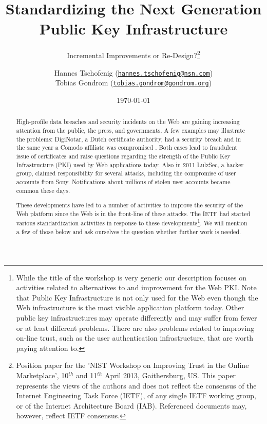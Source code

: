 \documentclass[a4paper]{scrreprt}
\title{Standardizing the Next Generation Public Key Infrastructure}
\subtitle{Incremental Improvements or Re-Design?\thanks{Position paper for the 'NIST Workshop on Improving Trust in the Online Marketplace', 10$^{th}$ and 11$^{th}$  April  2013, Gaithersburg, US. This paper represents the views of the authors and does not reflect the consensus of the Internet Engineering Task Force (IETF), of any single IETF working group, or of the Internet Architecture Board (IAB). Referenced documents may, however, reflect IETF consensus.}}
\author{Hannes Tschofenig (\texttt{\href{mailto:hannes.tschofenig@nsn.com}{hannes.tschofenig@nsn.com}})\\Tobias Gondrom   (\texttt{\href{mailto:tobias.gondrom@gondrom.org}{tobias.gondrom@gondrom.org}})}
\date{\today}
\begin{document}
\maketitle


\begin{abstract}

High-profile data breaches and security incidents on the Web are gaining increasing attention from the public, the press, and governments. A few examples may illustrate the problems: DigiNotar, a Dutch certificate authority, had a security breach \cite{DigiNotar} and in the same year a Comodo affiliate was compromised \cite{comodo}. Both cases lead to fraudulent issue of certificates and raise questions regarding the strength of the Public Key Infrastructure (PKI) used by Web applications today. Also in 2011 LulzSec, a hacker group, claimed responsibility for several attacks, including the compromise of user accounts from Sony. Notifications about millions of stolen user accounts became common these days. 

These developments have led to a number of activities to improve the security of the Web platform since the Web is in the front-line of these attacks. The IETF had started various standardization activities in response to these developments\footnote{While the title of the workshop is very generic our description focuses on activities related to alternatives to and improvement for the Web PKI. Note that Public Key Infrastructure is not only used for the Web even though the Web infrastructure is the most visible application platform today. Other public key infrastructures may operate differently and may suffer from fewer or at least different problems. There are also problems related to improving on-line trust, such as the user authentication infrastructure, that are worth paying attention to.}. We will mention a few of those below and ask ourselves the question whether further work is needed. 


\end{abstract}
\end{document}
